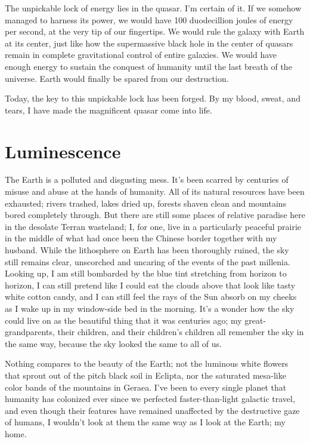 \documentclass{book}
\begin{document}
			The unpickable lock of energy lies in the quasar. I'm certain of it. If we somehow managed to
			harness its power, we would have 100 duodecillion joules of energy per second, at the very tip of
			our fingertips. We would rule the galaxy with Earth at its center, just like how the
			supermassive black hole in the center of quasars remain in complete gravitational control
			of entire galaxies. We would have enough energy to sustain the conquest of humanity until the
			last breath of the universe. Earth would finally be spared from our destruction.

			Today, the key to this unpickable lock has been forged. By my blood, sweat, and tears,
			I have made the magnificent quasar come into life.



		\chapter{Luminescence}
			The Earth is a polluted and disgusting mess. It's been scarred by centuries of misuse
			and abuse at the hands of humanity. All of its natural resources have been exhausted;
			rivers trashed, lakes dried up, forests shaven clean and mountains bored completely
			through. But there are still some places of relative paradise here in the desolate
			Terran wasteland; I, for one, live in a particularly peaceful prairie in the middle of
			what had once been the Chinese border together with my husband. While the
			lithosphere on Earth has been thoroughly ruined, the sky still remains clear,
			unscorched and uncaring of the events of the past millenia. Looking up, I am still
			bombarded by the blue tint stretching from horizon to horizon, I can still pretend like
			I could eat the clouds above that look like tasty white cotton candy, and I can still
			feel the rays of the Sun absorb on my cheeks as I wake up in my window-side bed in the
			morning. It's a wonder how the sky could live on as the beautiful thing that it was
			centuries ago; my great-grandparents, their children, and their children's children all
			remember the sky in the same way, because the sky looked the same to all of us.

			Nothing compares to the beauty of the Earth; not the luminous white flowers that sprout
			out of the pitch black soil in Eclipta, nor the saturated mesa-like color bands of the
			mountains in Geraea. I've been to every single planet that humanity has colonized ever
			since we perfected faster-than-light galactic travel, and even though their features
			have remained unaffected by the destructive gaze of humans, I wouldn't look at them the
			same way as I look at the Earth; my home.
\end{document}
